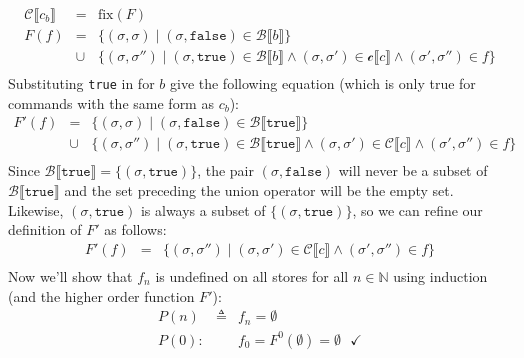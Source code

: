 \documentclass[10pt, oneside]{article}
\begin{document}
\begin{enumerate}[1.]
\begin{enumerate} [(a)]
      \begin{eqnarray*}
        \mathcal{C} \llbracket c_b \rrbracket & = & \text{fix}(F) \\
        F(f) & = & \{ (\sigma, \sigma) \mid (\sigma, \texttt{false}) \in 
                                           \mathcal{B} \llbracket b \rrbracket \}\\
            & \cup & \{(\sigma, \sigma'') 
               \mid (\sigma, \texttt{true}) \in \mathcal{B} \llbracket b\rrbracket
             \wedge (\sigma, \sigma') \in \mathcal{c} \llbracket c \rrbracket 
             \wedge (\sigma', \sigma'') \in f \} \\
      \end{eqnarray*}
      Substituting \texttt{true} in for $b$ give the following equation (which is 
      only true for commands with the same form as $c_b$):
      \begin{eqnarray*}
        F'(f) & = & \{ (\sigma, \sigma) \mid (\sigma, \texttt{false}) \in 
                               \mathcal{B} \llbracket \texttt{true} \rrbracket \}\\
            & \cup & \{(\sigma, \sigma'') 
    \mid (\sigma, \texttt{true}) \in \mathcal{B} \llbracket \texttt{true}\rrbracket
             \wedge (\sigma, \sigma') \in \mathcal{C} \llbracket c \rrbracket 
             \wedge (\sigma', \sigma'') \in f \} \\
      \end{eqnarray*} 
      Since $\mathcal{B} \llbracket \texttt{true} \rrbracket = \{(\sigma, 
      \texttt{true})\}$, the pair $(\sigma, \texttt{false})$ will never be a subset 
      of $\mathcal{B} \llbracket \texttt{true} \rrbracket$ and the set preceding 
      the union operator will be the empty set. Likewise, $(\sigma, \texttt{true})$ 
      is always a subset of $\{(\sigma, \texttt{true})\}$, so we can refine our 
      definition of $F'$ as follows:
            \begin{eqnarray*}
        F'(f) & = &  \{(\sigma, \sigma'') 
    					    \mid (\sigma, \sigma') \in \mathcal{C} \llbracket c \rrbracket 
                \wedge (\sigma', \sigma'') \in f \} \\
      \end{eqnarray*} 
      Now we'll show that $f_n$ is undefined on all stores for all $n \in
      \mathbb{N}$ using induction (and the higher order function $F'$):
      \begin{eqnarray*}
        P(n)  & \triangleq & f_n = \emptyset \\
        P(0): & & f_0 = F^0(\emptyset) = \emptyset \text{ } \checkmark \\

\end{eqnarray*}
\end{enumerate}
\end{enumerate}
\end{document}
